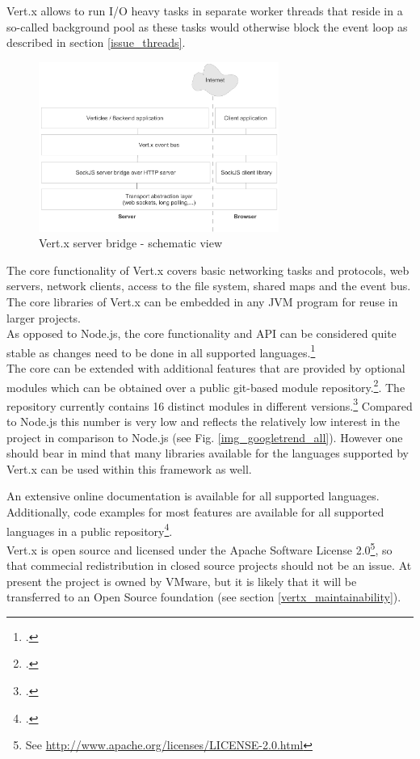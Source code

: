 Vert.x allows to run I/O heavy tasks in separate worker threads that reside in a
so-called background pool as these tasks would otherwise block the event loop as
described in section \ref{issue_threads}.

\begin{figure}[htb]
\centering
\includegraphics[width=0.7\textwidth]{img/vertx_server_bridge.pdf}
\caption[Vert.x server bridge]{Vert.x server bridge - schematic view}
\label{fig:server_bridge}
\end{figure}
%
The core functionality of Vert.x covers basic networking tasks and protocols,
web servers, network clients, access to the file system, shared maps and the event bus.
The core libraries of Vert.x can be embedded in any JVM program for reuse in
larger projects.\\
As opposed to Node.js, the core functionality and API can be considered quite
stable as changes need to be done in all supported languages.\footcite[Cf.][]{vertx_2012}\\ %
The core can be extended with additional features that are provided by optional
modules which can be obtained over a public git-based module
repository.\footcite[Cf.][]{vertx_mod_2012}.
The repository currently contains 16 distinct modules in different
versions.\footcite[Cf.][]{Vertx_repository_2012} Compared to Node.js this
number is very low and reflects the relatively low interest in the project
in comparison to Node.js (see Fig. \ref{img_googletrend_all}).
However one should bear in mind that many libraries available for the languages supported
by Vert.x can be used within this framework as well.

An extensive online documentation is available for all supported languages.
Additionally, code examples for most features are available for all supported languages in
a public repository\footcite[Cf.][]{Fox_2013}.\\
Vert.x is open source and licensed under the Apache Software License
2.0\footnote{See \url{http://www.apache.org/licenses/LICENSE-2.0.html}}, so that
commecial redistribution in closed source projects should not be an issue.
At present the project is owned by VMware, but it is likely that it will be transferred to
an Open Source foundation (see section \ref{vertx_maintainability}).


